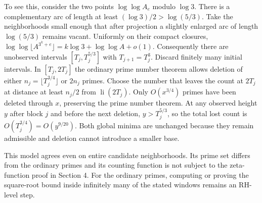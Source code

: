 \documentclass[11pt]{article}
\newcommand{\fl}[1]{\lfloor #1\rfloor}
\newcommand{\li}{\operatorname{li}}
\begin{document}
To see this, consider the two points $\log\log A_e$ modulo $\log3$. There is a complementary arc of length at least $(\log3)/2>\log(5/3)$. Take the neighborhoods small enough that after projection a slightly enlarged arc of length $\log(5/3)$ remains vacant. Uniformly on their compact closures,
$\log\log\fl{A^{3^k+e}}=k\log3+\log\log A+o(1)$.
Consequently there are unobserved intervals $[T_j,T_j^{5/3}]$ with $T_{j+1}=T_j^3$. Discard finitely many initial intervals. In $[T_j,2T_j]$ the ordinary prime number theorem allows deletion of either $n_j=\fl{T_j^{3/4}}$ or $2n_j$ primes. Choose the number that leaves the count at $2T_j$ at distance at least $n_j/2$ from $\li(2T_j)$. Only $O(x^{3/4})$ primes have been deleted through $x$, preserving the prime number theorem. At any observed height $y$ after block $j$ and before the next deletion, $y>T_j^{5/3}$, so the total lost count is $O(T_j^{3/4})=O(y^{9/20})$. Both global minima are unchanged because they remain admissible and deletion cannot introduce a smaller base.

This model agrees even on entire candidate neighborhoods. Its prime set differs from the ordinary primes and its counting function is not subject to the zeta-function proof in Section 4. For the ordinary primes, computing or proving the square-root bound inside infinitely many of the stated windows remains an RH-level step.

\appendix
\end{document}
